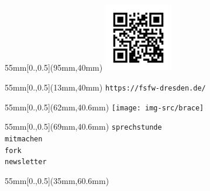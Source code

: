 \documentclass[t]{beamer}
\begin{document}
\begin{frame}[label=ct4]{\color{fg}{Weitere Informationen}}
 
 
 
  \begin{textblock*}{55mm}[0.,0.5](95mm,40mm)
 \includegraphics[width=30mm]{img-src/website-qr}
 \end{textblock*}
 
 
 \begin{textblock*}{55mm}[0.,0.5](13mm,40mm)
 \texttt{https://fsfw-dresden.de/}
 \end{textblock*}
 
 
  \begin{textblock*}{55mm}[0.,0.5](62mm,40.6mm)
 \texttt{[image: img-src/brace]}
 \end{textblock*}
 
 \begin{textblock*}{55mm}[0.,0.5](69mm,40.6mm)
 \texttt{sprechstunde}\\[1mm]
 \texttt{mitmachen}\\[1mm]
 \texttt{fork}\\[1mm]
 \texttt{newsletter}\\[1mm]
 \end{textblock*}

 
  \begin{textblock*}{55mm}[0.,0.5](35mm,60.6mm)
 \end{textblock*}

\end{frame}
\end{document}
